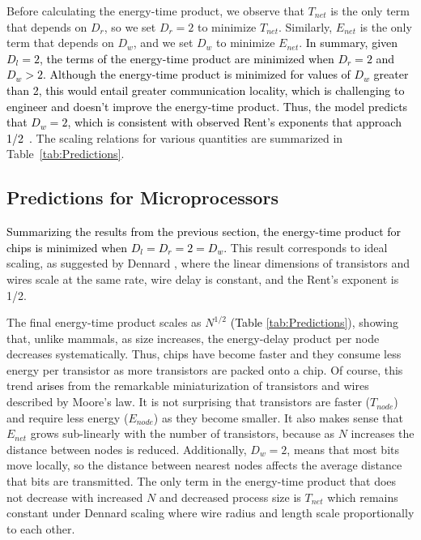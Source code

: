\documentclass[12pt]{article}
\newcommand{\red}[1]{\textcolor{black}{#1}}
\begin{document}
Before calculating the energy-time product, we observe that $T_{net}$ is the
only term that depends on $D_r$, so we set  $D_r = 2$ to minimize
$T_{net}$. Similarly, $E_{net}$ is the only term that depends on  $D_w$, and we
set $D_w$ to minimize $E_{net}$. \red{In summary, given $D_l = 2$, the terms of the energy-time product are minimized
when $D_r = 2$ and $D_w > 2$. Although
the energy-time product is minimized for values of $D_w$ greater than 2,
this would entail greater communication locality, which is challenging
to engineer and doesn't improve
the energy-time product.  Thus, the model predicts 
that $D_w = 2$, which is consistent with observed
Rent's exponents that approach 1/2~\cite{yang2001wirelength, solee2013evolutionary}.}  The scaling relations for various
quantities are summarized in Table~\ref{tab:Predictions}.

\subsection{Predictions for Microprocessors}
\label{sec:comp-predictions}

\red{Summarizing the results from the previous section, the energy-time
product for chips is minimized when 
$D_l=D_r =2 =D_w$.}
This result corresponds to ideal scaling, as suggested by Dennard
\cite{dennard74}, where the linear dimensions of transistors and wires scale at
the same rate, wire delay is constant, and the Rent's exponent is 1/2.  

The final energy-time product scales as $N^{1/2}$ \red{(Table \ref{tab:Predictions}}), showing that, unlike
mammals, as size increases, the energy-delay product per node decreases
systematically.  Thus, chips have become faster and they consume less energy per
transistor as more transistors are packed onto a chip. Of course, this
trend \red{arises}
from the remarkable miniaturization of transistors and wires described by
Moore's law. It is not surprising that transistors are faster ($T_{node}$) and
require less energy ($E_{node}$) as they become smaller. It also makes sense
that  $E_{net}$ grows sub-linearly with the number of transistors, because as
$N$ increases the distance between nodes is reduced. Additionally, $D_w = 2$,
means that most bits move locally, so the distance between nearest nodes
affects the average distance that bits are transmitted.  The only term in the
energy-time product that does not decrease with increased $N$ and decreased
process size is $T_{net}$ which remains constant under Dennard scaling where
wire radius and length scale proportionally to each other.
\end{document}
